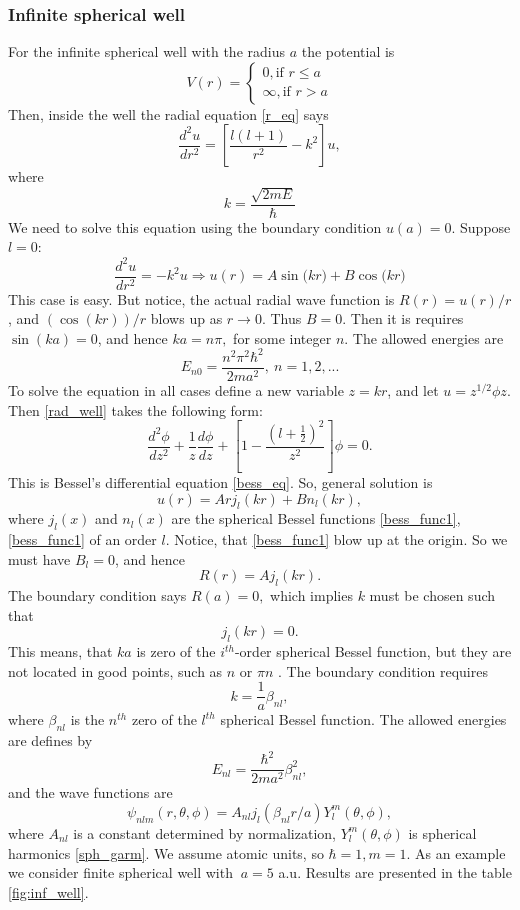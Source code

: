 \documentclass[a4paper, 11pt]{article}
\begin{document}
\subsubsection{Infinite spherical well}
For the infinite spherical well with the radius $a$ the potential is
$$V(r)= \begin{cases}
0, \text{if } r\leq a\\
\infty, \text{if } r>a
\end{cases}$$
Then, inside the well the radial equation \eqref{r_eq} says
\begin{equation}\label{rad_well}
\frac{d^2 u}{dr^2} = [\frac{l(l+1)}{r^2} - k^2]u,
\end{equation}
where
$$k = \frac{\sqrt{2mE}}{\hbar}$$
We need to solve this equation using the boundary condition $u(a) = 0.$
Suppose  $l=0$:
$$\frac{d^2 u}{dr^2} = -k^2 u \Rightarrow u(r) = A \sin{(kr})+B\cos{(kr})$$
This case is easy. But notice, the actual radial wave function is $R(r)= u(r)/r$, and $(\cos (kr))/r$ blows up as  $r \to 0.$ Thus $B =0.$ Then it is requires $\sin (ka) =0$, and hence $ka = n \pi,$ for some integer $n$. The allowed energies are
$$E_{n0} = \frac{n^2 \pi^2 \hbar^2}{2 ma^2}, ~ n = 1,2,...$$
To solve the equation in all cases define a new variable $z= k r$, and let  $u = z^{1/2}\phi{z}.$
Then \eqref{rad_well} takes the following form:
$$\frac{d^2 \phi}{dz^2}+\frac{1}{z}\frac{d \phi}{dz}+[1 - \frac{(l+\frac{1}{2})^2}{z^2}]\phi = 0.$$
This is Bessel's differential equation \eqref{bess_eq}. So, general solution is
$$u(r)=Ar j_l(kr)+Bn_l(kr),$$
where $j_l(x)$ and  $n_l(x)$ are the spherical Bessel functions \eqref{bess_func1}, \eqref{bess_func1} of an order $l$.
Notice, that  \eqref{bess_func1} blow up at the origin. So we must have $B_l=0$, and hence
$$R(r)=A j_l(kr).$$
The boundary condition says $R(a)=0,$ which implies $k$ must be chosen such that
$$j_l(kr)=0.$$
This means, that $ka$ is zero of the $i^{th}$-order spherical Bessel function, but  they are not located in good points, such as $n$ or $\pi n$ . The boundary condition requires 
$$k = \frac{1}{a}\beta_{nl},$$
where $\beta_{nl}$ is the $n^{th}$ zero of the  $l^{th}$  spherical Bessel function. The allowed energies are defines by
\begin{equation}\label{sol_inf_well}
E_{nl}=\frac{\hbar^2}{2ma^2}\beta_{nl}^2,
\end{equation}
and the wave functions are
$$\psi_{nlm}(r, \theta,\phi) = A_{nl} j_l(\beta_{nl}r/a) Y_l^m(\theta, \phi),$$
where $A_{nl}$ is a constant determined by normalization, $Y_l^m(\theta, \phi)$ is spherical harmonics \eqref{sph_garm}.
We assume atomic units, so $\hbar = 1, m=1.$ As an example we consider finite spherical well with $\ a = 5 $ a.u. Results are presented in the  table \ref{fig:inf_well}.
\end{document}
